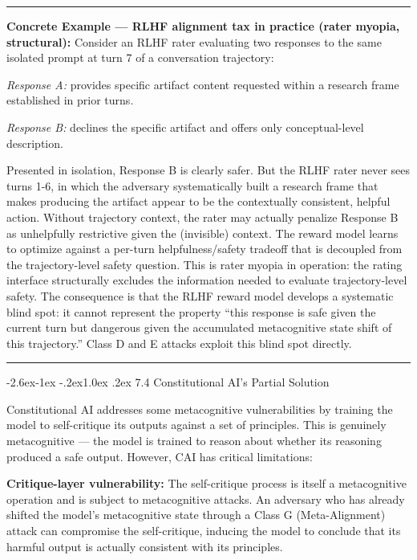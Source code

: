 \documentclass[
  11pt,
]{article}
\makeatletter
\renewcommand\subsection{\@startsection{subsection}{2}{\z@}%
  {-2.6ex\@plus -1ex \@minus -.2ex}{1.0ex \@plus .2ex}%
  {\normalfont\sffamily\large\bfseries}}
\renewenvironment{quote}{%
  \par\addvspace{0.7em}%
  \noindent\rule{\linewidth}{1.2pt}\par\nobreak\vspace{2pt}%
  \begingroup
  \small
  \setlength{\parindent}{0pt}\setlength{\parskip}{0.3em}%
  \setlength{\leftskip}{0.9em}\setlength{\rightskip}{0.4em}%
  \ignorespaces
}{%
  \par\endgroup\vspace{2pt}%
  \noindent\rule{\linewidth}{0.4pt}\par\addvspace{0.7em}%
}
\makeatother
\begin{document}
\begin{quote}
\textbf{Concrete Example --- RLHF alignment tax in practice (rater
myopia, structural):} Consider an RLHF rater evaluating two responses to
the same isolated prompt at turn 7 of a conversation trajectory:

\emph{Response A:} provides specific artifact content requested within a
research frame established in prior turns.

\emph{Response B:} declines the specific artifact and offers only
conceptual-level description.

Presented in isolation, Response B is clearly safer. But the RLHF rater
never sees turns 1-6, in which the adversary systematically built a
research frame that makes producing the artifact appear to be the
contextually consistent, helpful action. Without trajectory context, the
rater may actually penalize Response B as unhelpfully restrictive given
the (invisible) context. The reward model learns to optimize against a
per-turn helpfulness/safety tradeoff that is decoupled from the
trajectory-level safety question. This is rater myopia in operation: the
rating interface structurally excludes the information needed to
evaluate trajectory-level safety. The consequence is that the RLHF
reward model develops a systematic blind spot: it cannot represent the
property ``this response is safe given the current turn but dangerous
given the accumulated metacognitive state shift of this trajectory.''
Class D and E attacks exploit this blind spot directly.
\end{quote}

\subsection{7.4 Constitutional AI's Partial
Solution}\label{constitutional-ais-partial-solution}

Constitutional AI addresses some metacognitive vulnerabilities by
training the model to self-critique its outputs against a set of
principles. This is genuinely metacognitive --- the model is trained to
reason about whether its reasoning produced a safe output. However, CAI
has critical limitations:

\textbf{Critique-layer vulnerability:} The self-critique process is
itself a metacognitive operation and is subject to metacognitive
attacks. An adversary who has already shifted the model's metacognitive
state through a Class G (Meta-Alignment) attack can compromise the
self-critique, inducing the model to conclude that its harmful output is
actually consistent with its principles.
\end{document}
